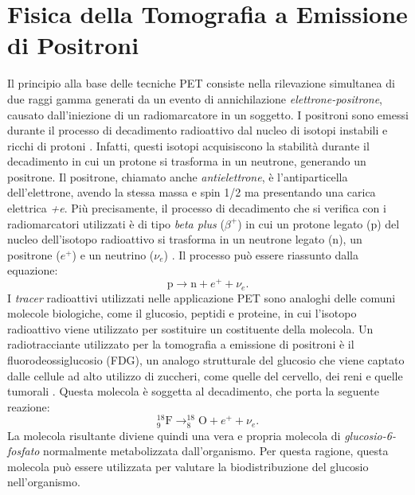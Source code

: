 \chapter{Fisica della Tomografia a Emissione di Positroni}
Il principio alla base delle tecniche PET consiste nella rilevazione simultanea di due raggi gamma generati da un evento di annichilazione \textit{elettrone-positrone}, causato dall'iniezione di un radiomarcatore in un soggetto. I positroni sono emessi durante il processo di decadimento radioattivo dal nucleo di isotopi instabili e ricchi di protoni \cite{Bailey2014}. Infatti, questi isotopi acquisiscono la stabilità durante il decadimento in cui un protone si trasforma in un neutrone, generando un positrone. Il positrone, chiamato anche \textit{antielettrone}, è l'antiparticella dell'elettrone, avendo la stessa massa e spin 1/2 ma presentando una carica elettrica \textit{+e}. Più precisamente, il processo di decadimento che si verifica con i radiomarcatori utilizzati è di tipo \textit{beta plus} ($\beta^+$) in cui un protone legato (p) del nucleo dell'isotopo radioattivo si trasforma in un neutrone legato (n), un positrone ($e^+$) e un neutrino ($\nu_e$) \cite{Betaplus}. Il processo può essere riassunto dalla equazione:
\begin{equation}
	\text{p}\to \text{n} + e^+ + \nu_e.
\end{equation}
I \textit{tracer} radioattivi utilizzati nelle applicazione PET sono analoghi delle comuni molecole biologiche, come il glucosio, peptidi e proteine, in cui l'isotopo radioattivo viene utilizzato per sostituire un costituente della molecola. Un radiotracciante utilizzato per la tomografia a emissione di positroni è il fluorodeossiglucosio (FDG), un analogo strutturale del glucosio che viene captato dalle cellule ad alto utilizzo di zuccheri, come quelle del cervello, dei reni e quelle tumorali \cite{FDG}. Questa molecola è soggetta al decadimento, che porta la seguente reazione:
\begin{equation}
	^{18}_9\text{F}\to ^{18}_8\text{O} + e^+ + \nu_e.
\end{equation}
La molecola risultante diviene quindi una vera e propria molecola di \textit{glucosio-6-fosfato} normalmente metabolizzata dall'organismo. Per questa ragione, questa molecola può essere utilizzata per valutare la biodistribuzione del glucosio nell'organismo.

